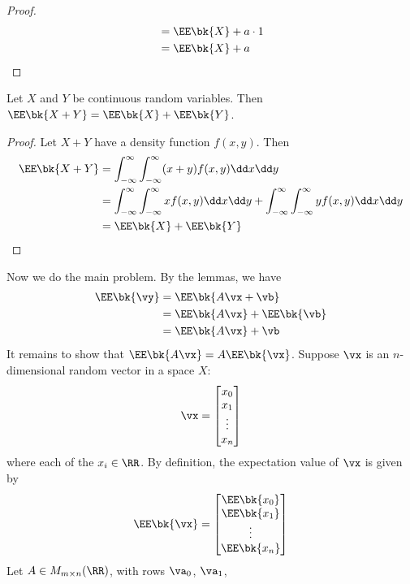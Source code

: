 \documentclass[189]{pset}
\begin{document}
\begin{enumerate}
\begin{proof}
\begin{align*}
            &= \EE\bk{X} + a\cdot 1 \\
            &= \EE\bk{X} + a
          \end{align*}
        \end{proof}
        \begin{lemma}
          Let $X$ and $Y$ be continuous random variables. Then
          $\EE\bk{X+Y} = \EE\bk{X}+\EE\bk{Y}$.
        \end{lemma}
        \begin{proof}
          Let $X+Y$ have a density function $f(x,y)$. Then
          \begin{align*}
            \EE\bk{X+Y}
            &= \int_{-\infty}^\infty \int_{-\infty}^\infty
              (x+y)f(x,y)\dd x \dd y \\
            &= \int_{-\infty}^\infty \int_{-\infty}^\infty xf(x,y) \dd
              x \dd y + \int_{-\infty}^\infty \int_{-\infty}^\infty
              yf(x,y) \dd x \dd y \\
            &= \EE\bk{X} + \EE\bk{Y}
          \end{align*}
        \end{proof}
        Now we do the main problem. By the lemmas, we have
        \begin{align*}
          \EE\bk{\vy}
          &= \EE\bk{A\vx + \vb} \\
          &= \EE\bk{A\vx} + \EE\bk{\vb} \\
          &= \EE\bk{A\vx} + \vb
        \end{align*}
        It remains to show that $\EE\bk{A\vx} = A\EE\bk{\vx}$. Suppose
        $\vx$ is an $n$-dimensional random vector in a space $X$:
        \[
          \vx =
          \begin{bmatrix}
            x_0 \\
            x_1 \\
            \vdots \\
            x_n
          \end{bmatrix}
        \]
        where each of the $x_i \in \RR$. By definition, the
        expectation value of $\vx$ is given by
        \[
          \EE\bk{\vx} =
          \begin{bmatrix}
            \EE\bk{x_0} \\
            \EE\bk{x_1} \\
            \vdots \\
            \EE\bk{x_n}
          \end{bmatrix}
        \]
        Let $A \in M_{m\times n}(\RR)$, with rows $\va_0$, $\va_1$,

\end{enumerate}
\end{document}
